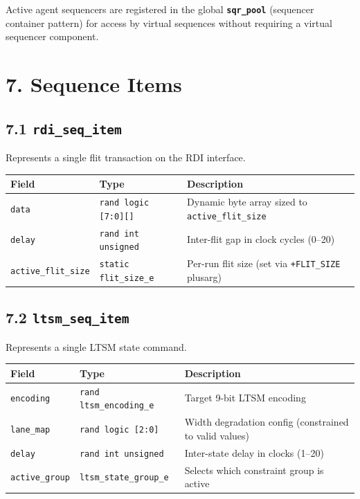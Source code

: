 \documentclass[11pt,a4paper]{article}
\begin{document}
Active agent sequencers are registered in the global \textbf{\texttt{sqr\_pool}} (sequencer container pattern) for access by virtual sequences without requiring a virtual sequencer component.


\section{7. Sequence Items}

\subsection{7.1 \texttt{rdi\_seq\_item}}

Represents a single flit transaction on the RDI interface.


\begin{tabularx}{\textwidth}{|X|X|X|}
\hline
\textbf{Field} & \textbf{Type} & \textbf{Description} \\
\hline
\texttt{data} & \texttt{rand logic [7:0][]} & Dynamic byte array sized to \texttt{active\_flit\_size} \\
\hline
\texttt{delay} & \texttt{rand int unsigned} & Inter-flit gap in clock cycles (0--20) \\
\hline
\texttt{active\_flit\_size} & \texttt{static flit\_size\_e} & Per-run flit size (set via \texttt{+FLIT\_SIZE} plusarg) \\
\hline
\end{tabularx}


\subsection{7.2 \texttt{ltsm\_seq\_item}}

Represents a single LTSM state command.


\begin{tabularx}{\textwidth}{|X|X|X|}
\hline
\textbf{Field} & \textbf{Type} & \textbf{Description} \\
\hline
\texttt{encoding} & \texttt{rand ltsm\_encoding\_e} & Target 9-bit LTSM encoding \\
\hline
\texttt{lane\_map} & \texttt{rand logic [2:0]} & Width degradation config (constrained to valid values) \\
\hline
\texttt{delay} & \texttt{rand int unsigned} & Inter-state delay in clocks (1--20) \\
\hline
\texttt{active\_group} & \texttt{ltsm\_state\_group\_e} & Selects which constraint group is active \\
\hline
\end{tabularx}
\end{document}
